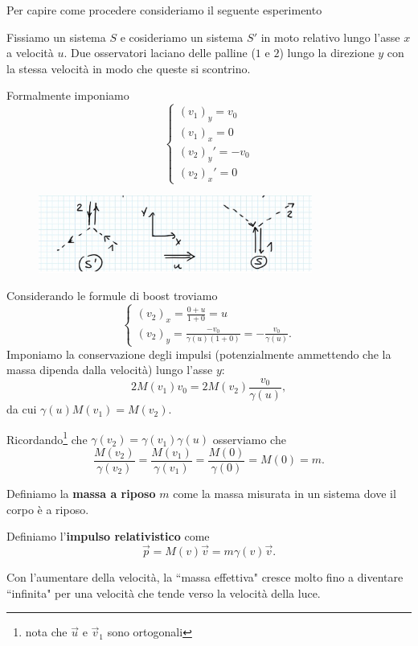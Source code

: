 \noindent Per capire come procedere consideriamo il seguente esperimento

\begin{example}
Fissiamo un sistema $S$ e cosideriamo un sistema $S'$ in moto relativo lungo l'asse $x$ a velocit\`a $u$. Due osservatori laciano delle palline ($1$ e $2$) lungo la direzione $y$ con la stessa velocit\`a in modo che queste si scontrino.\smallskip

\noindent Formalmente imponiamo
\[\begin{cases}
(v_1)_y=v_0\\
(v_1)_x=0\\
(v_2)_y'=-v_0\\
(v_2)_x'=0
\end{cases}\]
\begin{figure}[!htb]
    \centering
    \includegraphics[width=9cm]{images/Palline_relativistiche_def_massa.png}
\end{figure}

\noindent
Considerando le formule di boost troviamo
\[\begin{cases}
(v_2)_x=\frac{0+u}{1+0}=u\\
(v_2)_y=\frac{-v_0}{\gamma(u)(1+0)}=-\frac{v_0}{\gamma(u)}.
\end{cases}\]
Imponiamo la conservazione degli impulsi (potenzialmente ammettendo che la massa dipenda dalla velocit\`a) lungo l'asse $y$:
\[2M(v_1)v_0=2M(v_2)\frac{v_0}{\gamma(u)},\]
da cui $\gamma(u)M(v_1)=M(v_2)$.\medskip

\noindent Ricordando\footnote{nota che $\vec u$ e $\vec v_1$ sono ortogonali} che $\gamma(v_2)=\gamma(v_1)\gamma(u)$ osserviamo che
\[\frac{M(v_2)}{\gamma(v_2)}=\frac{M(v_1)}{\gamma(v_1)}=\frac{M(0)}{\gamma(0)}=M(0)=m.\]

\end{example}

\begin{definition}
Definiamo la \textbf{massa a riposo} $m$ come la massa misurata in un sistema dove il corpo \`e a riposo.
\end{definition}

\begin{definition}
Definiamo l'\textbf{impulso relativistico} come
\[\vec p=M(v)\vec v=m\gamma(v)\vec v.\]
\end{definition}
\begin{remark}
Con l'aumentare della velocit\`a, la ``massa effettiva" cresce molto fino a diventare ``infinita" per una velocit\`a che tende verso la velocit\`a della luce.
\end{remark}

